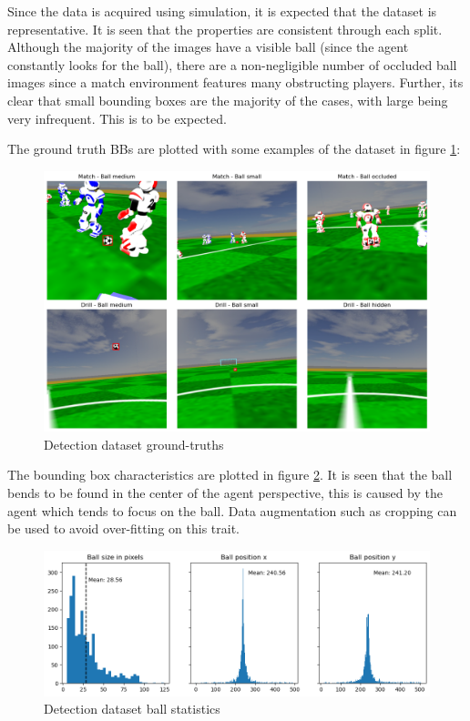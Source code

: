\documentclass[a4paper,twoside,12pt]{report}
\begin{document}
Since the data is acquired using simulation, it is expected that the dataset is representative. It is seen that the properties are consistent through each split. Although the majority of the images have a visible ball (since the agent constantly looks for the ball), there are a non-negligible number of occluded ball images since a match environment features many obstructing players. Further, its clear that small bounding boxes are the majority of the cases, with large being very infrequent. This is to be expected.

The ground truth BBs are plotted with some examples of the dataset in figure \ref{fig:detectimages}:

\begin{figure}[h!]
\begin{center}
\includegraphics[width=16cm]{images/imagedetections.png}
\caption{Detection dataset ground-truths}
\label{fig:detectimages}
\end{center}
\end{figure}

The bounding box characteristics are plotted in figure \ref{fig:detectplot}. It is seen that the ball bends to be found in the center of the agent perspective, this is caused by the agent which tends to focus on the ball. Data augmentation such as cropping can be used to avoid over-fitting on this trait.

\begin{figure}[h!]
\begin{center}
\includegraphics[width=15cm]{images/plotdetections.png}
\caption{Detection dataset ball statistics}
\label{fig:detectplot}
\end{center}
\end{figure}
\end{document}
